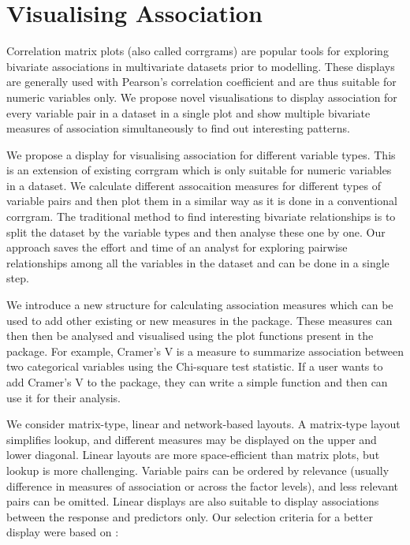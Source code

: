 \hypertarget{visualising-association}{%
\section{Visualising Association}\label{visualising-association}}

Correlation matrix plots (also called corrgrams) are popular tools for
exploring bivariate associations in multivariate datasets prior to
modelling. These displays are generally used with Pearson's correlation
coefficient and are thus suitable for numeric variables only. We propose
novel visualisations to display association for every variable pair in a
dataset in a single plot and show multiple bivariate measures of
association simultaneously to find out interesting patterns.

We propose a display for visualising association for different variable
types. This is an extension of existing corrgram which is only suitable
for numeric variables in a dataset. We calculate different assocaition
measures for different types of variable pairs and then plot them in a
similar way as it is done in a conventional corrgram. The traditional
method to find interesting bivariate relationships is to split the
dataset by the variable types and then analyse these one by one. Our
approach saves the effort and time of an analyst for exploring pairwise
relationships among all the variables in the dataset and can be done in
a single step.

We introduce a new structure for calculating association measures which
can be used to add other existing or new measures in the package. These
measures can then then be analysed and visualised using the plot
functions present in the package. For example, Cramer's V is a measure
to summarize association between two categorical variables using the
Chi-square test statistic. If a user wants to add Cramer's V to the
package, they can write a simple function and then can use it for their
analysis.

We consider matrix-type, linear and network-based layouts. A matrix-type
layout simplifies lookup, and different measures may be displayed on the
upper and lower diagonal. Linear layouts are more space-efficient than
matrix plots, but lookup is more challenging. Variable pairs can be
ordered by relevance (usually difference in measures of association or
across the factor levels), and less relevant pairs can be omitted.
Linear displays are also suitable to display associations between the
response and predictors only. Our selection criteria for a better
display were based on :

